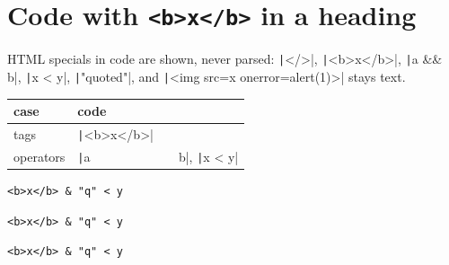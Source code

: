 \section{Code with \texttt{<b>x</b>} in a heading}

HTML specials in code are shown, never parsed: \texttt|</>|, \texttt|<b>x</b>|, \texttt|a && b|,
\texttt|x < y|, \texttt|"quoted"|, and \texttt|<img src=x onerror=alert(1)>| stays text.

\begin{tabular}{ll}
\toprule
case & code \\
\midrule
tags & \texttt|<b>x</b>| \\
operators & \texttt|a && b|, \texttt|x < y| \\
\bottomrule
\end{tabular}

\begin{verbatim}
<b>x</b> & "q" < y
\end{verbatim}

\begin{verbatim}
<b>x</b> & "q" < y
\end{verbatim}

\begin{verbatim}
<b>x</b> & "q" < y
\end{verbatim}

